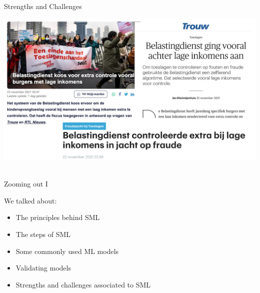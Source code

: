 \documentclass[handout]{beamer}
\begin{document}
\begin{frame}{Strengths and Challenges}
	
	\begin{center}
		\includegraphics[width=\linewidth,height=\textheight,keepaspectratio]{../pictures/toeslagenaffaire_headlines.png} \\\
	\end{center}
	
	
\end{frame}


\begin{frame}{Zooming out I} 
	
	We talked about:
	\begin{itemize}
		\item The principles behind SML
		\item The steps of SML
		\item Some commonly used ML models
		\item Validating models
		\item Strengths and challenges associated to SML \\\
	\end{itemize}
	
	
\end{frame}
\end{document}
